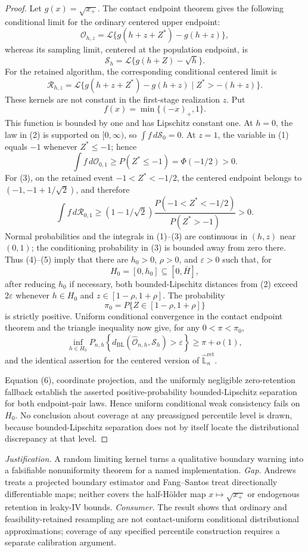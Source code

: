 \documentclass{article}
\begin{document}
\begin{proof}
Let \(g(x)=\sqrt{x_+}\). The contact endpoint theorem gives the following conditional limit for the ordinary centered upper endpoint:
\[
 \mathcal O_{h,z}
 =\mathcal L\{g(h+z+Z^*)-g(h+z)\}, \tag{1}
\]
whereas its sampling limit, centered at the population endpoint, is
\[
 \mathcal S_h
 =\mathcal L\{g(h+Z)-\sqrt h\}. \tag{2}
\]
For the retained algorithm, the corresponding conditional centered limit is
\[
 \mathcal R_{h,z}
 =\mathcal L\{g(h+z+Z^*)-g(h+z)\mid
 Z^*>-(h+z)\}. \tag{3}
\]
These kernels are not constant in the first-stage realization \(z\). Put
\[
 f(x)=\min\{(-x)_+,1\}.
\]
This function is bounded by one and has Lipschitz constant one. At \(h=0\), the law in (2) is supported on \([0,\infty)\), so \(\int f\,d\mathcal S_0=0\). At \(z=1\), the variable in (1) equals \(-1\) whenever \(Z^*\leq-1\); hence
\[
 \int f\,d\mathcal O_{0,1}
 \geq P(Z^*\leq-1)=\Phi(-1/2)>0. \tag{4}
\]
For (3), on the retained event \(-1<Z^*<-1/2\), the centered endpoint belongs to \((-1,-1+1/\sqrt2)\), and therefore
\[
 \int f\,d\mathcal R_{0,1}
 \geq (1-1/\sqrt2)
 \frac{P(-1<Z^*<-1/2)}{P(Z^*>-1)}>0. \tag{5}
\]
Normal probabilities and the integrals in (1)--(3) are continuous in \((h,z)\) near \((0,1)\); the conditioning probability in (3) is bounded away from zero there. Thus (4)--(5) imply that there are \(h_0>0\), \(\rho>0\), and \(\varepsilon>0\) such that, for
\[
 H_0=[0,h_0]\subseteq[0,\bar H],
\]
after reducing \(h_0\) if necessary, both bounded-Lipschitz distances from (2) exceed \(2\varepsilon\) whenever \(h\in H_0\) and \(z\in[1-\rho,1+\rho]\). The probability
\[
 \pi_0=P\{Z\in[1-\rho,1+\rho]\}
\]
is strictly positive. Uniform conditional convergence in the contact endpoint theorem and the triangle inequality now give, for any \(0<\pi<\pi_0\),
\[
 \inf_{h\in H_0}P_{n,h}\!\left\{
 d_{\mathrm{BL}}(\widehat{\mathcal O}_{n,h},\mathcal S_h)
 >\varepsilon\right\}\geq\pi+o(1), \tag{6}
\]
and the identical assertion for the centered version of \(\widehat{\mathbb L}_n^{\mathrm{ret}}\).

Equation (6), coordinate projection, and the uniformly negligible zero-retention fallback establish the asserted positive-probability bounded-Lipschitz separation for both endpoint-pair laws. Hence uniform conditional weak consistency fails on \(H_0\). No conclusion about coverage at any preassigned percentile level is drawn, because bounded-Lipschitz separation does not by itself locate the distributional discrepancy at that level.
\end{proof}
\par\smallskip\noindent \textit{Justification.} A random limiting kernel turns a qualitative boundary warning into a falsifiable nonuniformity theorem for a named implementation. \textit{Gap.} Andrews treats a projected boundary estimator and Fang--Santos treat directionally differentiable maps; neither covers the half-Hölder map \(x\mapsto\sqrt{x_+}\) or endogenous retention in leaky-IV bounds. \textit{Consumer.} The result shows that ordinary and feasibility-retained resampling are not contact-uniform conditional distributional approximations; coverage of any specified percentile construction requires a separate calibration argument.
\end{document}
